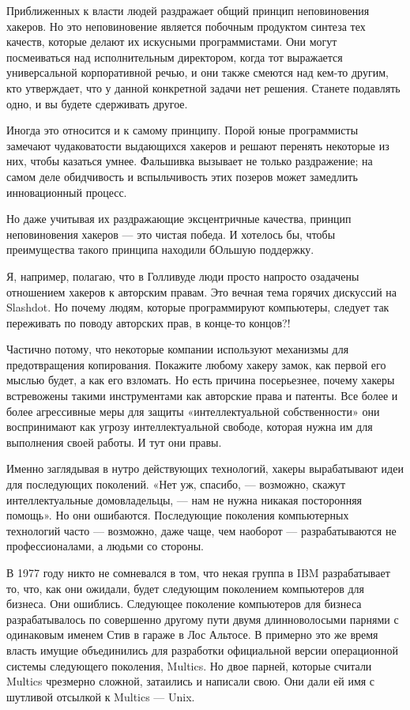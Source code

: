 \documentclass[ebook,12pt,oneside,openany]{memoir}
\begin{document}
Приближенных к власти людей раздражает общий принцип неповиновения
хакеров. Но это неповиновение является побочным продуктом синтеза тех
качеств, которые делают их искусными программистами. Они могут
посмеиваться над исполнительным директором, когда тот выражается
универсальной корпоративной речью, и они также смеются над кем-то
другим, кто утверждает, что у данной конкретной задачи нет решения.
Станете подавлять одно, и вы будете сдерживать другое.

Иногда это относится и к самому принципу. Порой юные программисты
замечают чудаковатости выдающихся хакеров и решают перенять некоторые
из них, чтобы казаться умнее. Фальшивка вызывает не только
раздражение; на самом деле обидчивость и вспыльчивость этих позеров
может замедлить инновационный процесс.

Но даже учитывая их раздражающие эксцентричные качества, принцип
неповиновения хакеров — это чистая победа. И хотелось бы, чтобы
преимущества такого принципа находили бОльшую поддержку.

Я, например, полагаю, что в Голливуде люди просто напросто озадачены
отношением хакеров к авторским правам. Это вечная тема горячих
дискуссий на Slashdot. Но почему людям, которые программируют
компьютеры, следует так переживать по поводу авторских прав, в
конце-то концов?!

Частично потому, что некоторые компании используют механизмы для
предотвращения копирования. Покажите любому хакеру замок, как первой
его мыслью будет, а как его взломать. Но есть причина посерьезнее,
почему хакеры встревожены такими инструментами как авторские права и
патенты. Все более и более агрессивные меры для защиты
«интеллектуальной собственности» они воспринимают как угрозу
интеллектуальной свободе, которая нужна им для выполнения своей
работы. И тут они правы.

Именно заглядывая в нутро действующих технологий, хакеры вырабатывают
идеи для последующих поколений. «Нет уж, спасибо, — возможно, скажут
интеллектуальные домовладельцы, — нам не нужна никакая посторонняя
помощь». Но они ошибаются. Последующие поколения компьютерных
технологий часто — возможно, даже чаще, чем наоборот — разрабатываются
не профессионалами, а людьми со стороны.


В 1977 году никто не сомневался в том, что некая группа в IBM
разрабатывает то, что, как они ожидали, будет следующим поколением
компьютеров для бизнеса. Они ошиблись. Следующее поколение компьютеров
для бизнеса разрабатывалось по совершенно другому пути двумя
длинноволосыми парнями с одинаковым именем Стив в гараже в Лос
Альтосе. В примерно это же время власть имущие объединились для
разработки официальной версии операционной системы следующего
поколения, Multics. Но двое парней, которые считали Multics чрезмерно
сложной, затаились и написали свою. Они дали ей имя с шутливой
отсылкой к Multics — Unix.
\end{document}
